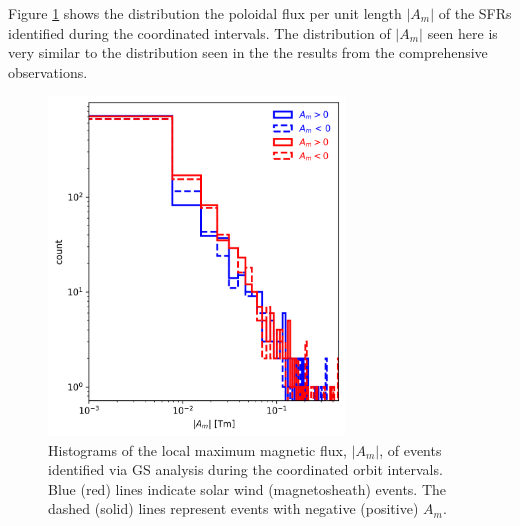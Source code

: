 \noindent Figure \ref{fig:histogram-Asplit-coordinated} shows the distribution the poloidal flux per unit length $|A_m|$ of the SFRs identified during the coordinated intervals. The distribution of $|A_m|$ seen here is very similar to the distribution seen in the the results from the comprehensive observations.

\begin{figure}
    \centering
    \includegraphics[width=0.7\textwidth]{Figures/Histograms/Asplit_coordinated.png}
    \caption[Histogram of poloidal magnetic ﬂux per unit length from coordinated analysis]{Histograms of the local maximum magnetic flux, $|A_m|$, of events identified via GS analysis during the coordinated orbit intervals. Blue (red) lines indicate solar wind (magnetosheath) events. The dashed (solid) lines represent events with negative (positive) $A_m$.}
    \label{fig:histogram-Asplit-coordinated}
\end{figure}



